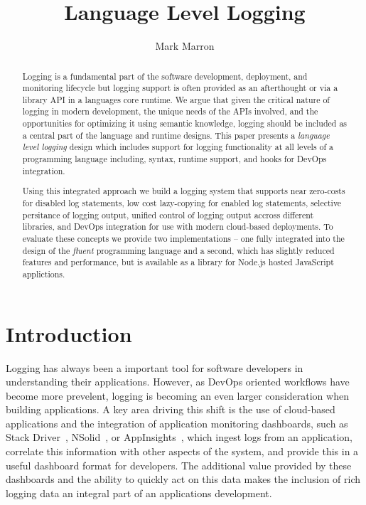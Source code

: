 \documentclass[twocolumn,10pt]{article}
\begin{document}
\title{Language Level Logging} \author{Mark Marron}
\maketitle

\begin{abstract} 
Logging is a fundamental part of the software development, deployment, and
monitoring lifecycle but logging support is often provided as an afterthought or
via a library API in a languages core runtime. We argue that given the critical
nature of logging in modern development, the unique needs of the APIs involved,
and the opportunities for optimizing it using semantic knowledge, logging should
be included as a central part of the language and runtime designs. This paper
presents a \emph{language level logging} design which includes support for
logging functionality at all levels of a programming language including, syntax,
runtime support, and hooks for DevOps integration.

Using this integrated approach we build a logging system that supports near
zero-costs for disabled log statements, low cost lazy-copying for enabled log
statements, selective persitance of logging output, unified control of logging
output accross different libraries, and DevOps integration for use with modern
cloud-based deployments. To evaluate these concepts we provide two
implementations -- one fully integrated into the design of the \emph{fluent}
programming language and a second, which has slightly reduced features and
performance, but is available as a library for Node.js hosted JavaScript
applictions.
\end{abstract}

\section{Introduction} 
Logging has always been a important tool for software developers in
understanding their applications. However, as DevOps oriented workflows have
become more prevelent, logging is becoming an even larger consideration when
building applications. A key area driving this shift is the use of cloud-based
applications and the integration of application monitoring dashboards, such as
Stack Driver~\cite{StackDriver}, NSolid~\cite{NSolid}, or
AppInsights~\cite{AppInsights}, which ingest logs from an application, correlate
this information with other aspects of the system, and provide this in a useful
dashboard format for developers. The additional value provided by these
dashboards and the ability to quickly act on this data makes the inclusion of
rich logging data an integral part of an applications development.
\end{document}
